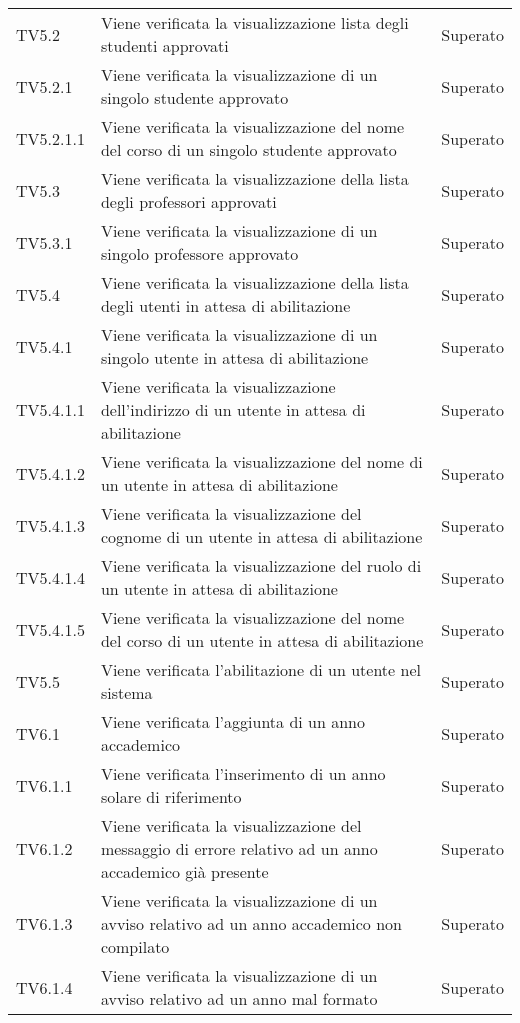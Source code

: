 \documentclass[PianoDiQualifica.tex]{subfiles}
\begin{document}
\begin{longtable}[H]{P{2cm}P{8.5cm}P{3cm}}
	TV5.2 & Viene verificata la visualizzazione lista degli studenti approvati & Superato \\ 
	TV5.2.1 & Viene verificata la visualizzazione di un singolo studente approvato & Superato \\ 
	TV5.2.1.1 & Viene verificata la visualizzazione del nome del corso di un singolo studente approvato & Superato \\ 
	TV5.3 & Viene verificata la visualizzazione della lista degli professori approvati & Superato \\ 
	TV5.3.1 & Viene verificata la visualizzazione di un singolo professore approvato & Superato \\ 
	TV5.4 & Viene verificata la visualizzazione della lista degli utenti in attesa di abilitazione & Superato \\ 
	TV5.4.1 & Viene verificata la visualizzazione di un singolo utente in attesa di abilitazione & Superato \\ 
	TV5.4.1.1 & Viene verificata la visualizzazione dell'indirizzo di un utente in attesa di abilitazione & Superato \\ 
	TV5.4.1.2 & Viene verificata la visualizzazione del nome di un utente in attesa di abilitazione & Superato \\ 
	TV5.4.1.3 & Viene verificata la visualizzazione del cognome di un utente in attesa di abilitazione & Superato \\ 
	TV5.4.1.4 & Viene verificata la visualizzazione del ruolo di un utente in attesa di abilitazione & Superato \\ 
	TV5.4.1.5 & Viene verificata la visualizzazione del nome del corso di un utente in attesa di abilitazione & Superato \\ 
	TV5.5 & Viene verificata l'abilitazione di un utente nel sistema & Superato \\ 
	TV6.1 & Viene verificata l'aggiunta di un anno accademico & Superato \\ 
	TV6.1.1 & Viene verificata l'inserimento di un anno solare di riferimento & Superato \\ 
	TV6.1.2 & Viene verificata la visualizzazione del messaggio di errore relativo ad un anno accademico già presente & Superato \\ 
	TV6.1.3 & Viene verificata la visualizzazione di un avviso relativo ad un anno accademico non compilato & Superato \\ 
	TV6.1.4 & Viene verificata la visualizzazione di un avviso relativo ad un anno mal formato & Superato \\ 

\end{longtable}
\end{document}
